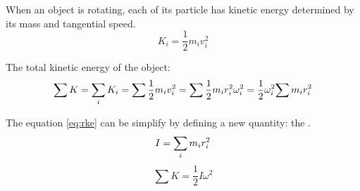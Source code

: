         \par When an object is rotating, each of its particle has kinetic energy determined by its
        mass and tangential speed.
        \begin{equation}
            K_{i} = \dfrac{1}{2} m_{i}v_{i}^{2}
        \end{equation}
        \par The total kinetic energy of the object:
        \begin{equation} \label{eq:rke}
            \sum K = {\sum\limits _{i} K_{i}} = {\sum\limits \dfrac{1}{2} m_{i}v_{i}^{2}}
            = {\sum\limits \dfrac{1}{2} m_{i}r_{i}^{2} \omega_{i}^{2}}
            = \dfrac{1}{2} \omega_{i}^{2} {\sum\limits m_{i}r_{i}^{2}}
        \end{equation}
        \par The equation \eqref{eq:rke} can be simplify by defining a new quantity: the
        .
        \begin{equation}
            I = {\sum\limits _{i} m_{i}r_{i}^{2}}
        \end{equation}
        \begin{equation}
            \sum K = \dfrac{1}{2} I \omega^{2}
        \end{equation}

